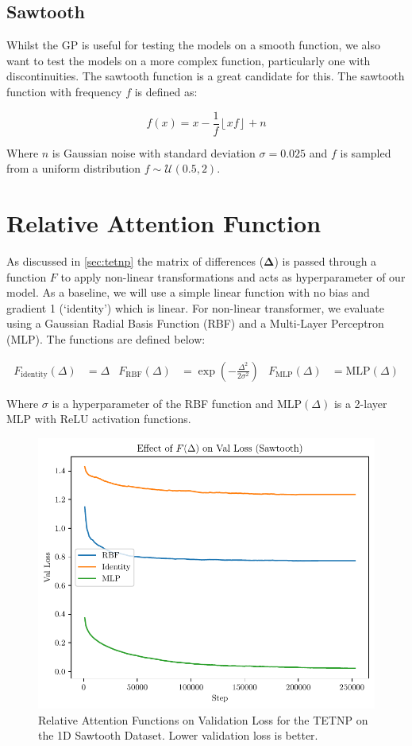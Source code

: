 \documentclass[../../main.tex]{subfiles}
\begin{document}
\subsection{Sawtooth}
\label{sec:1d-sawtooth-dataset}

Whilst the GP is useful for testing the models on a smooth function, we also want to test the models on a more complex function, particularly one with discontinuities. The sawtooth function is a great candidate for this. The sawtooth function with frequency $f$ is defined as:

\begin{equation}
	f(x) = x - \frac{1}{f} \left\lfloor xf \right\rfloor + n
\end{equation}

Where $n$ is Gaussian noise with standard deviation $\sigma = 0.025$ and $f$ is sampled from a uniform distribution $f \sim \mathcal{U}(0.5, 2)$.


\section{Relative Attention Function}

As discussed in \autoref{sec:tetnp} the matrix of differences ($\bm{\Delta}$) is passed through a function $F$ to apply non-linear transformations and acts as hyperparameter of our model. As a baseline, we will use a simple linear function with no bias and gradient 1 (`identity') which is linear. For non-linear transformer, we evaluate using a Gaussian Radial Basis Function (RBF) and a Multi-Layer Perceptron (MLP). The functions are defined below:

\begin{align}
	F_{\text{identity}}(\Delta) &= \Delta&
	F_{\text{RBF}}(\Delta) &= \exp\left(-\frac{\Delta^2}{2\sigma^2}\right)&
	F_{\text{MLP}}(\Delta) &= \text{MLP}(\Delta)
\end{align}

Where $\sigma$ is a hyperparameter of the RBF function and $\text{MLP}(\Delta)$ is a 2-layer MLP with ReLU \parencite{agarap2019deep} activation functions.

\begin{figure}[H]
	\centering
	\includegraphics[width=0.6\linewidth]{./F-on-loss.pdf}
	\caption{Relative Attention Functions on Validation Loss for the TETNP on the 1D Sawtooth Dataset. Lower validation loss is better.}
	\label{fig:relative-attn-func-1d}
\end{figure}
\end{document}
